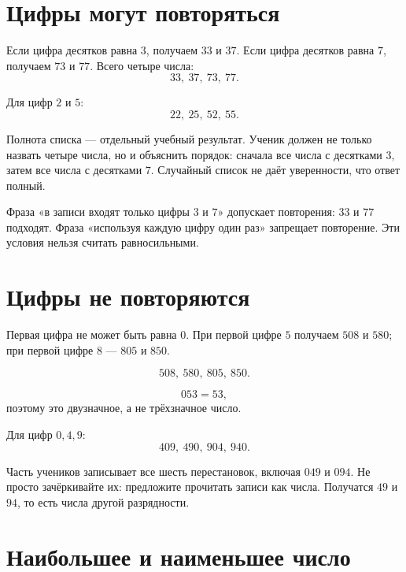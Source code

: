 \section{Цифры могут повторяться}

\repeatstreefigure

Если цифра десятков равна \(3\), получаем \(33\) и \(37\). Если цифра
десятков равна \(7\), получаем \(73\) и \(77\). Всего четыре числа:
\[
  \boxed{33,\ 37,\ 73,\ 77}.
\]

Для цифр \(2\) и \(5\):
\[
  \boxed{22,\ 25,\ 52,\ 55}.
\]

\begin{teacherbox}
  Полнота списка --- отдельный учебный результат. Ученик должен не только
  назвать четыре числа, но и объяснить порядок: сначала все числа с
  десятками \(3\), затем все числа с десятками \(7\). Случайный список не
  даёт уверенности, что ответ полный.
\end{teacherbox}

\begin{teacherbox}
  Фраза «в записи входят только цифры \(3\) и \(7\)» допускает повторения:
  \(33\) и \(77\) подходят. Фраза «используя каждую цифру один раз» запрещает
  повторение. Эти условия нельзя считать равносильными.
\end{teacherbox}

\section{Цифры не повторяются}

\norepeattreefigure

Первая цифра не может быть равна \(0\). При первой цифре \(5\) получаем
\(508\) и \(580\); при первой цифре \(8\) --- \(805\) и \(850\).

\[
  \boxed{508,\ 580,\ 805,\ 850}.
\]

\[
  053=53,
\]
поэтому это двузначное, а не трёхзначное число.

Для цифр \(0,4,9\):
\[
  \boxed{409,\ 490,\ 904,\ 940}.
\]

\begin{teacherbox}
  Часть учеников записывает все шесть перестановок, включая \(049\) и
  \(094\). Не просто зачёркивайте их: предложите прочитать записи как числа.
  Получатся \(49\) и \(94\), то есть числа другой разрядности.
\end{teacherbox}

\section{Наибольшее и наименьшее число}

